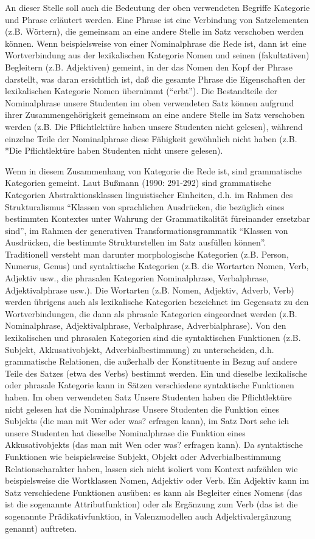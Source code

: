\documentclass[
]{article}
\begin{document}
An dieser Stelle soll auch die Bedeutung der oben verwendeten Begriffe Kategorie und Phrase erläutert werden. Eine Phrase ist eine Verbindung von Satzelementen (z.B. Wörtern), die gemeinsam an eine andere Stelle im Satz verschoben werden können. Wenn beispielsweise von einer Nominalphrase die Rede ist, dann ist eine Wortverbindung aus der lexikalischen Kategorie Nomen und seinen (fakultativen) Begleitern (z.B. Adjektiven) gemeint, in der das Nomen den Kopf der Phrase darstellt, was daran ersichtlich ist, daß die gesamte Phrase die Eigenschaften der lexikalischen Kategorie Nomen übernimmt (``erbt''). Die Bestandteile der Nominalphrase unsere Studenten im oben verwendeten Satz können aufgrund ihrer Zusammengehörigkeit gemeinsam an eine andere Stelle im Satz verschoben werden (z.B. Die Pflichtlektüre haben unsere Studenten nicht gelesen), während einzelne Teile der Nominalphrase diese Fähigkeit gewöhnlich nicht haben (z.B. *Die Pflichtlektüre haben Studenten nicht unsere gelesen).

Wenn in diesem Zusammenhang von Kategorie die Rede ist, sind grammatische Kategorien gemeint. Laut Bußmann (1990: 291-292) sind grammatische Kategorien Abstraktionsklassen linguistischer Einheiten, d.h. im Rahmen des Strukturalismus ``Klassen von sprachlichen Ausdrücken, die bezüglich eines bestimmten Kontextes unter Wahrung der Grammatikalität füreinander ersetzbar sind'', im Rahmen der generativen Transformationsgrammatik ``Klassen von Ausdrücken, die bestimmte Strukturstellen im Satz ausfüllen können''. Traditionell versteht man darunter morphologische Kategorien (z.B. Person, Numerus, Genus) und syntaktische Kategorien (z.B. die Wortarten Nomen, Verb, Adjektiv usw., die phrasalen Kategorien Nominalphrase, Verbalphrase, Adjektivalphrase usw.). Die Wortarten (z.B. Nomen, Adjektiv, Adverb, Verb) werden übrigens auch als lexikalische Kategorien bezeichnet im Gegensatz zu den Wortverbindungen, die dann als phrasale Kategorien eingeordnet werden (z.B. Nominalphrase, Adjektivalphrase, Verbalphrase, Adverbialphrase). Von den lexikalischen und phrasalen Kategorien sind die syntaktischen Funktionen (z.B. Subjekt, Akkusativobjekt, Adverbialbestimmung) zu unterscheiden, d.h. grammatische Relationen, die außerhalb der Konstituente in Bezug auf andere Teile des Satzes (etwa des Verbs) bestimmt werden. Ein und dieselbe lexikalische oder phrasale Kategorie kann in Sätzen verschiedene syntaktische Funktionen haben. Im oben verwendeten Satz Unsere Studenten haben die Pflichtlektüre nicht gelesen hat die Nominalphrase Unsere Studenten die Funktion eines Subjekts (die man mit Wer oder was? erfragen kann), im Satz Dort sehe ich unsere Studenten hat dieselbe Nominalphrase die Funktion eines Akkusativobjekts (das man mit Wen oder was? erfragen kann). Da syntaktische Funktionen wie beispielsweise Subjekt, Objekt oder Adverbialbestimmung Relationscharakter haben, lassen sich nicht isoliert vom Kontext aufzählen wie beispielsweise die Wortklassen Nomen, Adjektiv oder Verb. Ein Adjektiv kann im Satz verschiedene Funktionen ausüben: es kann als Begleiter eines Nomens (das ist die sogenannte Attributfunktion) oder als Ergänzung zum Verb (das ist die sogenannte Prädikativfunktion, in Valenzmodellen auch Adjektivalergänzung genannt) auftreten.
\end{document}
